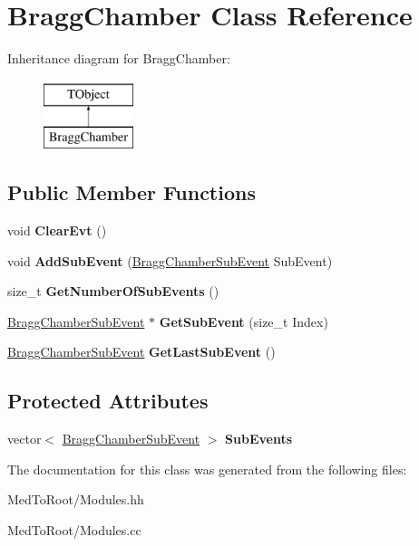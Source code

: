 \hypertarget{class_bragg_chamber}{}\section{Bragg\+Chamber Class Reference}
\label{class_bragg_chamber}
Inheritance diagram for Bragg\+Chamber\+:\begin{figure}[H]
\begin{center}
\leavevmode
\includegraphics[height=2.000000cm]{class_bragg_chamber}
\end{center}
\end{figure}
\subsection*{Public Member Functions}
\begin{DoxyCompactItemize}
\item 
\mbox{\label{class_bragg_chamber_ae8a4df69182d582b29182850f3aeacbe}} 
void {\bfseries Clear\+Evt} ()
\item 
\mbox{\label{class_bragg_chamber_a578cee86f2c835bcf877e89f2cc3dcc7}} 
void {\bfseries Add\+Sub\+Event} (\hyperlink{class_bragg_chamber_sub_event}{Bragg\+Chamber\+Sub\+Event} Sub\+Event)
\item 
\mbox{\label{class_bragg_chamber_a5dae757b5621222d724e2aa1a36f5ac3}} 
size\+\_\+t {\bfseries Get\+Number\+Of\+Sub\+Events} ()
\item 
\mbox{\label{class_bragg_chamber_a03454d6f7eb1605bd0dcc5cbce199b7e}} 
\hyperlink{class_bragg_chamber_sub_event}{Bragg\+Chamber\+Sub\+Event} $\ast$ {\bfseries Get\+Sub\+Event} (size\+\_\+t Index)
\item 
\mbox{\label{class_bragg_chamber_a2bb4b74450e9d16b1634e43b86f64bf8}} 
\hyperlink{class_bragg_chamber_sub_event}{Bragg\+Chamber\+Sub\+Event} {\bfseries Get\+Last\+Sub\+Event} ()
\end{DoxyCompactItemize}
\subsection*{Protected Attributes}
\begin{DoxyCompactItemize}
\item 
\mbox{\label{class_bragg_chamber_aca89325f585002ab74998709253575e3}} 
vector$<$ \hyperlink{class_bragg_chamber_sub_event}{Bragg\+Chamber\+Sub\+Event} $>$ {\bfseries Sub\+Events}
\end{DoxyCompactItemize}


The documentation for this class was generated from the following files\+:\begin{DoxyCompactItemize}
\item 
Med\+To\+Root/Modules.\+hh\item 
Med\+To\+Root/Modules.\+cc\end{DoxyCompactItemize}
